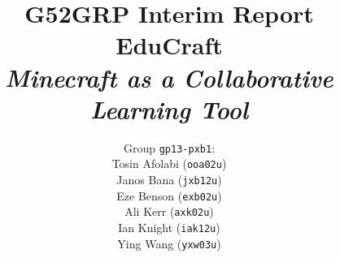 \documentclass[11pt,a4paper]{report}
\begin{document}
\title{{\normalsize G52GRP Interim Report}\\EduCraft\\\textit{Minecraft as a Collaborative Learning Tool}}
\author{Group \texttt{gp13-pxb1}:\\
            Tosin Afolabi (\texttt{ooa02u})\\
            Janos Bana (\texttt{jxb12u})\\
            Eze Benson (\texttt{exb02u})\\
            Ali Kerr (\texttt{axk02u})\\
            Ian Knight (\texttt{iak12u})\\
            Ying Wang (\texttt{yxw03u})
            }
\maketitle

\tableofcontents









\end{document}
